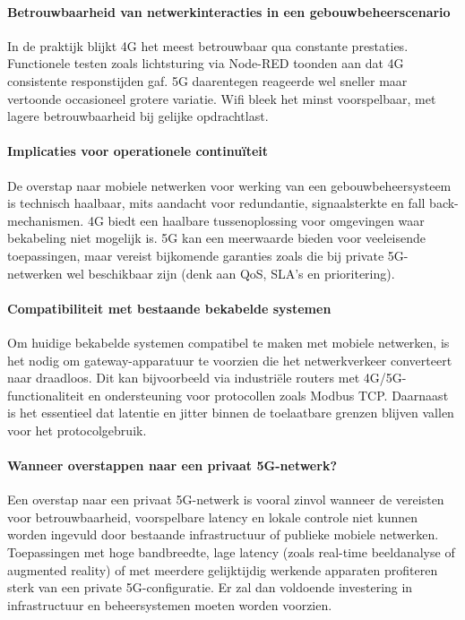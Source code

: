 \paragraph{Betrouwbaarheid van netwerkinteracties in een gebouwbeheerscenario}
In de praktijk blijkt 4G het meest betrouwbaar qua constante prestaties. Functionele testen zoals lichtsturing via Node-RED toonden aan dat 4G consistente responstijden gaf. 5G daarentegen reageerde wel  sneller maar vertoonde occasioneel grotere variatie. Wifi bleek het minst voorspelbaar, met lagere betrouwbaarheid bij gelijke opdrachtlast.

\paragraph{Implicaties voor operationele continuïteit}
De overstap naar mobiele netwerken voor werking van een gebouwbeheersysteem is technisch haalbaar, mits aandacht voor redundantie, signaalsterkte en fall back-mechanismen. 4G biedt een haalbare tussenoplossing voor omgevingen waar bekabeling niet mogelijk is. 5G kan een meerwaarde bieden voor veeleisende toepassingen, maar vereist bijkomende garanties zoals die bij private 5G-netwerken wel beschikbaar zijn (denk aan QoS, SLA’s en prioritering).

\paragraph{Compatibiliteit met bestaande bekabelde systemen}
Om huidige bekabelde systemen compatibel te maken met mobiele netwerken, is het nodig om gateway-apparatuur te voorzien die het netwerkverkeer converteert naar draadloos. Dit kan bijvoorbeeld via industriële routers met 4G/5G-functionaliteit en ondersteuning voor protocollen zoals Modbus TCP. Daarnaast is het essentieel dat latentie en jitter binnen de toelaatbare grenzen blijven vallen voor het protocolgebruik.

\paragraph{Wanneer overstappen naar een privaat 5G-netwerk?}
Een overstap naar een privaat 5G-netwerk is vooral zinvol wanneer de vereisten voor betrouwbaarheid, voorspelbare latency en lokale controle niet kunnen worden ingevuld door bestaande infrastructuur of publieke mobiele netwerken. Toepassingen met hoge bandbreedte, lage latency (zoals real-time beeldanalyse of augmented reality) of met meerdere gelijktijdig werkende apparaten profiteren sterk van een private 5G-configuratie. Er zal dan voldoende investering in infrastructuur en beheersystemen moeten worden voorzien.


